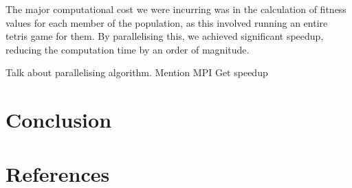 \documentclass{article}
\begin{document}
	The major computational cost we were incurring was in the calculation of fitness
	values for each member of the population, as this involved running an entire
	tetris game for them. By parallelising this, we achieved significant speedup,
	reducing the computation time by an order of magnitude.



    Talk about parallelising algorithm. Mention MPI
    Get speedup

    \section{Conclusion}


    \section{References}
\end{document}
